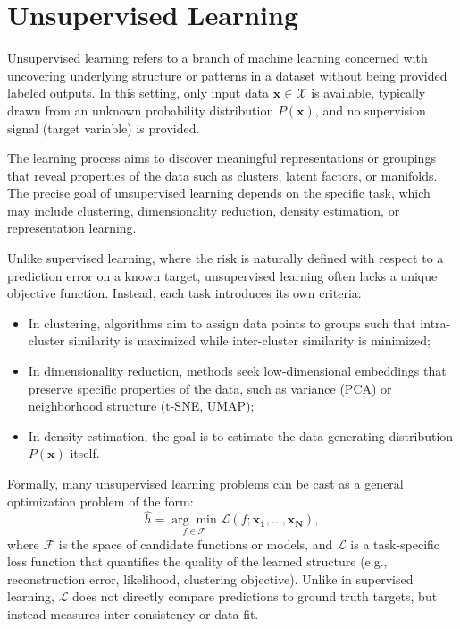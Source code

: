 \section{Unsupervised Learning}\label{sec:unsupervised_learning}
Unsupervised learning refers to a branch of machine learning concerned with
uncovering underlying structure or patterns in a dataset without being provided
labeled outputs. In this setting, only input data $\mathbf{x} \in \mathcal{X}$
is available, typically drawn from an unknown probability distribution
$P(\mathbf{x})$, and no supervision signal (target variable) is provided.

The learning process aims to discover meaningful representations or groupings
that reveal properties of the data such as clusters, latent factors, or
manifolds. The precise goal of unsupervised learning depends on the specific
task, which may include clustering, dimensionality reduction, density
estimation, or representation learning.

Unlike supervised learning, where the risk is naturally defined with respect to
a prediction error on a known target, unsupervised learning often lacks a
unique objective function. Instead, each task introduces its own criteria:
\begin{itemize}
    \item In clustering, algorithms aim to assign data points to groups such that
          intra-cluster similarity is maximized while inter-cluster similarity is
          minimized;
    \item In dimensionality reduction, methods seek low-dimensional embeddings that
          preserve specific properties of the data, such as variance (PCA) or
          neighborhood structure (t-SNE, UMAP);
    \item In density estimation, the goal is to estimate the data-generating distribution
          $P(\mathbf{x})$ itself.
\end{itemize}

Formally, many unsupervised learning problems can be cast as a general
optimization problem of the form:
\begin{equation}
    \hat{h} = \underset{f \in \mathcal{F}}{\arg\min} \mathcal{L}(f; \mathbf{x_1,\ldots,x_N}),
\end{equation}
where $\mathcal{F}$ is the space of candidate functions or models, and
$\mathcal{L}$ is a task-specific loss function that quantifies the quality of
the learned structure (e.g., reconstruction error, likelihood, clustering
objective). Unlike in supervised learning, $\mathcal{L}$ does not directly
compare predictions to ground truth targets, but instead measures
inter-consistency or data fit.

